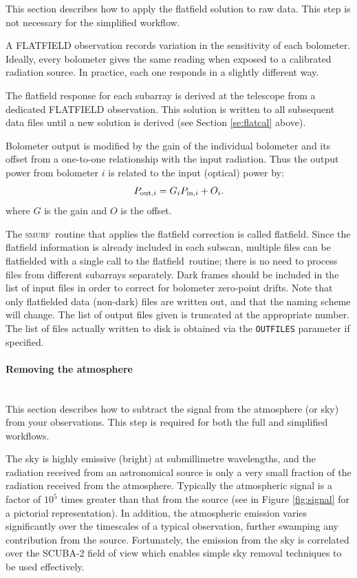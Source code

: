 \documentclass[twoside,11pt]{article}
\newcommand{\xref}[3]{#1}
\newcommand{\xlabel}[1]{}
\renewcommand{\_}{\texttt{\symbol{95}}}
\newcommand{\SMURF}{\textsc{smurf}}
\newcommand{\task}[1]{\textsf{#1}}
\newcommand{\flatfield}{\xref{\task{flatfield}}{sun258}{FLATFIELD}}
\newcommand{\aparam}[1]{\texttt{#1}}     %
\begin{document}
This section describes how to apply the flatfield solution to raw
data. This step is not necessary for the simplified workflow.

A FLATFIELD observation records variation in the sensitivity of each
bolometer. Ideally, every bolometer gives the same reading when
exposed to a calibrated radiation source. In practice, each one
responds in a slightly different way.

The flatfield response for each subarray is derived at the telescope
from a dedicated FLATFIELD observation. This solution is written to
all subsequent data files until a new solution is derived (see Section
\ref{se:flatcal} above).

Bolometer output is modified by the gain of the individual bolometer
and its offset from a one-to-one relationship with the input
radiation. Thus the output power from bolometer $i$ is related to the
input (optical) power by:
\begin{equation}
P_{{\rm out},i} = G_i P_{{\rm in},i} + O_i.
\end{equation}
where $G$ is the gain and $O$ is the offset.

The \SMURF\ routine that applies the flatfield correction is called
\flatfield. Since the flatfield information is already included in
each subscan, multiple files can be flatfielded with a single call to
the \flatfield\ routine; there is no need to process files from
different subarrays separately. Dark frames should be included in the
list of input files in order to correct for bolometer zero-point
drifts. Note that only flatfielded data (non-dark) files are written
out, and that the naming scheme will change. The list of output files
given is truncated at the appropriate number. The list of files
actually written to disk is obtained via the \aparam{OUTFILES}
parameter if specified.

\paragraph{\xlabel{skysub}Removing the atmosphere\label{se:skysub}} \ \\

This section describes how to subtract the signal from the atmosphere
(or sky) from your observations. This step is required for both the
full and simplified workflows.

The sky is highly emissive (bright) at submillimetre wavelengths, and
the radiation received from an astronomical source is only a very
small fraction of the radiation received from the
atmosphere. Typically the atmospheric signal is a factor of $10^5$
times greater than that from the source (see in Figure
\ref{fig:signal} for a pictorial representation). In addition, the
atmospheric emission varies significantly over the timescales of a
typical observation, further swamping any contribution from the
source. Fortunately, the emission from the sky is correlated over the
SCUBA-2 field of view which enables simple sky removal techniques to
be used effectively.
\end{document}
